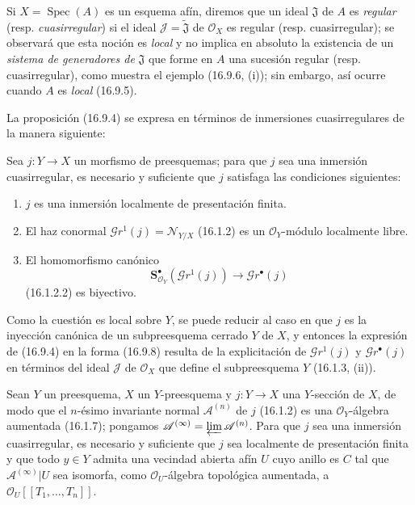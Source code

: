 \begin{env}[16.9.7]
\label{IV.16.9.7}
Si $X=\operatorname{Spec}(A)$ es un esquema afín, diremos que un ideal
$\mathfrak{J}$ de $A$ es \emph{regular} (resp. \emph{cuasirregular}) si el ideal
$\mathscr{J}=\widetilde{\mathfrak{J}}$ de $\mathcal{O}_X$ es regular
(resp. cuasirregular); se observará que esta noción es \emph{local} y no implica en
absoluto la existencia de un \emph{sistema de generadores de} $\mathfrak{J}$ que
forme en $A$ una sucesión regular (resp. cuasirregular), como muestra el
ejemplo (16.9.6, (i)); sin embargo, así ocurre cuando $A$ es \emph{local} (16.9.5).

La proposición (16.9.4) se expresa en términos de inmersiones cuasirregulares
de la manera siguiente:
\end{env}

\begin{proposition}[16.9.8]
\label{IV.16.9.8}
Sea $j:Y\to X$ un morfismo de preesquemas; para que $j$ sea una inmersión
cuasirregular, es necesario y suficiente que $j$ satisfaga las condiciones
siguientes:
\begin{enumerate}
  \item[\textup{(i)}] $j$ es una inmersión localmente de presentación finita.
  \item[\textup{(ii)}] El haz conormal
  $\mathscr{G}r^1(j)=\mathcal{N}_{Y/X}$ \textup{(16.1.2)} es un
  $\mathcal{O}_Y$-módulo localmente libre.
  \item[\textup{(iii)}] El homomorfismo canónico
  \[
    \mathbf{S}_{\mathcal{O}_Y}^{\bullet}
      (\mathscr{G}r^1(j))\longrightarrow\mathscr{G}r^{\bullet}(j)
  \]
  \textup{(16.1.2.2)} es biyectivo.
\end{enumerate}
\end{proposition}

Como la cuestión es local sobre $Y$, se puede reducir al caso en que $j$ es
la inyección canónica de un subpreesquema cerrado $Y$ de $X$, y entonces la
expresión de (16.9.4) en la forma (16.9.8) resulta de la explicitación de
$\mathscr{G}r^1(j)$ y $\mathscr{G}r^{\bullet}(j)$ en términos del
ideal $\mathscr{J}$ de $\mathcal{O}_X$ que define el subpreesquema $Y$
(16.1.3, (ii)).

\begin{corollary}[16.9.9]
\label{IV.16.9.9}
Sean $Y$ un preesquema, $X$ un $Y$-preesquema y $j:Y\to X$ una $Y$-sección
de $X$, de modo que el $n$-ésimo invariante normal $\mathscr{A}^{(n)}$ de $j$
\textup{(16.1.2)} es una $\mathcal{O}_Y$-álgebra aumentada \textup{(16.1.7)}; pongamos
$\mathscr{A}^{(\infty)}=\varprojlim\mathscr{A}^{(n)}$. Para que $j$ sea una
inmersión cuasirregular, es necesario y suficiente que $j$ sea localmente de
presentación finita y que todo $y\in Y$ admita una vecindad abierta afín $U$
cuyo anillo es $C$ tal que $\mathscr{A}^{(\infty)}|U$ sea isomorfa, como
$\mathcal{O}_U$-álgebra topológica aumentada, a
$\mathcal{O}_U[[T_1,\ldots,T_n]]$.
\end{corollary}

